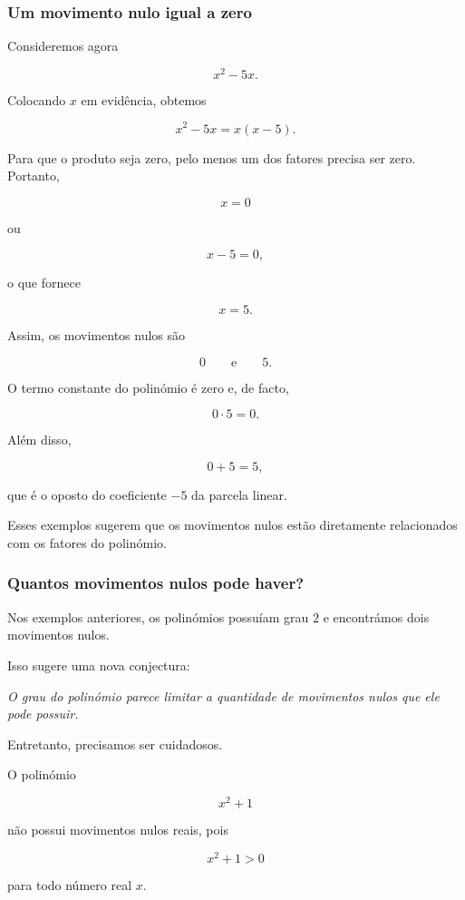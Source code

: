 \documentclass[12pt,a4paper]{article}
\begin{document}
\subsubsection{Um movimento nulo igual a zero}

Consideremos agora

\[
x^2-5x.
\]

Colocando \(x\) em evidência, obtemos

\[
x^2-5x=x(x-5).
\]

Para que o produto seja zero, pelo menos um dos fatores precisa ser
zero. Portanto,

\[
x=0
\]

ou

\[
x-5=0,
\]

o que fornece

\[
x=5.
\]

Assim, os movimentos nulos são

\[
0
\qquad\text{e}\qquad
5.
\]

O termo constante do polinómio é zero e, de facto,

\[
0\cdot5=0.
\]

Além disso,

\[
0+5=5,
\]

que é o oposto do coeficiente \(-5\) da parcela linear.

Esses exemplos sugerem que os movimentos nulos estão diretamente
relacionados com os fatores do polinómio.

\subsubsection{Quantos movimentos nulos pode haver?}

Nos exemplos anteriores, os polinómios possuíam grau \(2\) e encontrámos
dois movimentos nulos.

Isso sugere uma nova conjectura:

\begin{center}
\emph{O grau do polinómio parece limitar a quantidade de movimentos
nulos que ele pode possuir.}
\end{center}

Entretanto, precisamos ser cuidadosos.

O polinómio

\[
x^2+1
\]

não possui movimentos nulos reais, pois

\[
x^2+1>0
\]

para todo número real \(x\).
\end{document}
